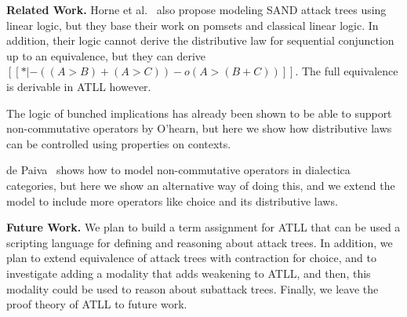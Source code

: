 \textbf{Related Work.}  Horne et al.~\cite{horne2017semantics} also
propose modeling SAND attack trees using linear logic, but they base
their work on pomsets and classical linear logic.  In addition, their
logic cannot derive the distributive law for sequential conjunction up
to an equivalence, but they can derive $[[* |- ((A > B) + (A > C)) -o
    (A > (B + C))]]$.  The full equivalence is derivable in ATLL
however.

The logic of bunched implications \cite{Ohearn:2003} has already been
shown to be able to support non-commutative operators by O'hearn, but
here we show how distributive laws can be controlled using properties
on contexts.

de Paiva~\cite{depaiva1991} shows how to model non-commutative
operators in dialectica categories, but here we show an alternative
way of doing this, and we extend the model to include more operators
like choice and its distributive laws.

\textbf{Future Work.}  We plan to build a term assignment for ATLL
that can be used a scripting language for defining and reasoning about
attack trees.  In addition, we plan to extend equivalence of attack
trees with contraction for choice, and to investigate adding a
modality that adds weakening to ATLL, and then, this modality could be
used to reason about subattack trees.  Finally, we leave the proof
theory of ATLL to future work.
